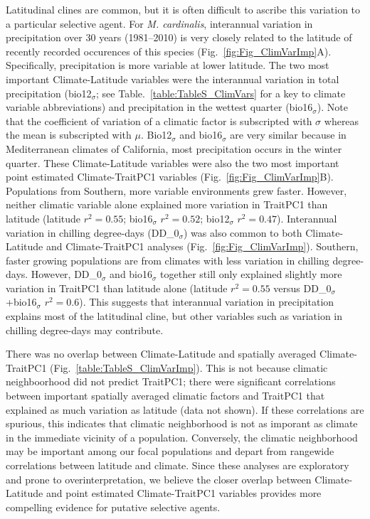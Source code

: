 \documentclass[11pt, oneside]{article}
\begin{document}
Latitudinal clines are common, but it is often difficult to ascribe this variation to a particular selective agent. For \textit{M. cardinalis}, interannual variation in precipitation over 30 years (1981--2010) is very closely related to the latitude of recently recorded occurences of this species (Fig.~\ref{fig:Fig_ClimVarImp}A). Specifically, precipitation is more variable at lower latitude. The two most important Climate-Latitude variables were the interannual variation in total precipitation (bio12$_\sigma$; see Table.~\ref{table:TableS_ClimVars} for a key to climate variable abbreviations) and precipitation in the wettest quarter (bio16$_\sigma$). Note that the coefficient of variation of a climatic factor is subscripted with $\sigma$ whereas the mean is subscripted with $\mu$. Bio12$_\sigma$ and bio16$_\sigma$ are very similar because in Mediterranean climates of California, most precipitation occurs in the winter quarter. These Climate-Latitude variables were also the two most important point estimated Climate-TraitPC1 variables (Fig.~\ref{fig:Fig_ClimVarImp}B). Populations from Southern, more variable environments grew faster. However, neither climatic variable alone explained more variation in TraitPC1 than latitude (latitude $r^2=0.55$; bio16$_\sigma$ $r^2=0.52$; bio12$_\sigma$ $r^2=0.47$). Interannual variation in chilling degree-days (DD\_0$_\sigma$) was also common to both Climate-Latitude and Climate-TraitPC1 analyses (Fig.~\ref{fig:Fig_ClimVarImp}). Southern, faster growing populations are from climates with less variation in chilling degree-days. However, DD\_0$_\sigma$ and bio16$_\sigma$ together still only explained slightly more variation in TraitPC1 than latitude alone (latitude $r^2=0.55$ versus DD\_0$_\sigma$+bio16$_\sigma$ $r^2=0.6$). This suggests that interannual variation in precipitation explains most of the latitudinal cline, but other variables such as variation in chilling degree-days may contribute.

There was no overlap between Climate-Latitude and spatially averaged Climate-TraitPC1 (Fig.~\ref{table:TableS_ClimVarImp}). This is not because climatic neighboorhood did not predict TraitPC1; there were significant correlations between important spatially averaged climatic factors and TraitPC1 that explained as much variation as latitude (data not shown). If these correlations are spurious, this indicates that climatic neighborhood is not as imporant as climate in the immediate vicinity of a population. Conversely, the climatic neighborhood may be important among our focal populations and depart from rangewide correlations between latitude and climate. Since these analyses are exploratory and prone to overinterpretation, we believe the closer overlap between Climate-Latitude and point estimated Climate-TraitPC1 variables provides more compelling evidence for putative selective agents.
\end{document}
